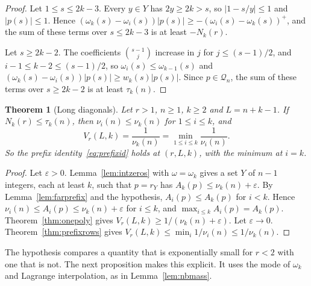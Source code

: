 \documentclass[11pt]{article}
\newtheorem{theorem}{Theorem}[section]
\begin{document}
\begin{proof}
Let $1\le s\le2k-3$.  Every $y\in Y$ has $2y\ge2k>s$, so $|1-s/y|\le1$ and
$|p(s)|\le1$.  Hence
$(\omega_k(s)-\omega_i(s))|p(s)|\ge-(\omega_i(s)-\omega_k(s))^+$, and the
sum of these terms over $s\le2k-3$ is at least $-N_k(r)$.

Let $s\ge2k-2$.  The coefficients $\binom{s-1}j$ increase in $j$ for
$j\le(s-1)/2$, and $i-1\le k-2\le(s-1)/2$, so $\omega_i(s)\le\omega_{k-1}(s)$
and $(\omega_k(s)-\omega_i(s))|p(s)|\ge w_k(s)|p(s)|$.  Since $p\in\mathcal Q_n$,
the sum of these terms over $s\ge2k-2$ is at least $\tau_k(n)$.
\end{proof}

\begin{theorem}[Long diagonals]\label{thm:longdiag}
Let $r>1$, $n\ge1$, $k\ge2$ and $L=n+k-1$.  If $N_k(r)\le\tau_k(n)$, then
$\nu_i(n)\le\nu_k(n)$ for $1\le i\le k$, and
\[
  V_r(L,k)=\frac1{\nu_k(n)}=\min_{1\le i\le k}\frac1{\nu_i(n)} .
\]
So the prefix identity~\eqref{eq:prefixid} holds at
$(r,L,k)$, with the minimum at $i=k$.
\end{theorem}

\begin{proof}
Let $\varepsilon>0$.  Lemma~\ref{lem:intzeros} with $\omega=\omega_k$ gives a
set $Y$ of $n-1$ integers, each at least $k$, such that $p=r_Y$ has
$A_k(p)\le\nu_k(n)+\varepsilon$.  By Lemma~\ref{lem:farprefix} and the
hypothesis, $A_i(p)\le A_k(p)$ for $i<k$.  Hence
$\nu_i(n)\le A_i(p)\le\nu_k(n)+\varepsilon$ for $i\le k$, and
$\max_{i\le k}A_i(p)=A_k(p)$.  Theorem~\ref{thm:onepoly} gives
$V_r(L,k)\ge1/(\nu_k(n)+\varepsilon)$.  Let $\varepsilon\to0$.
Theorem~\ref{thm:prefixrows} gives
$V_r(L,k)\le\min_i1/\nu_i(n)\le1/\nu_k(n)$.
\end{proof}

The hypothesis compares a quantity that is exponentially small for $r<2$
with one that is not.  The next proposition makes this explicit.  It uses
the mode of $\omega_k$ and Lagrange interpolation, as in
Lemma~\ref{lem:nbmass}.
\end{document}
